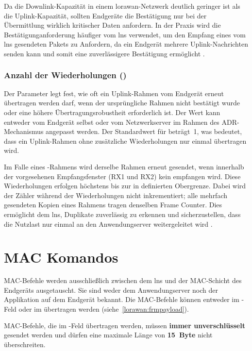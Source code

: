 	Da die Downlink-Kapazität in einem \ac{lorawan}-Netzwerk deutlich geringer ist als die Uplink-Kapazität, sollten Endgeräte die Bestätigung nur bei der Übermittlung wirklich kritischer Daten anfordern. In der Praxis wird die Bestätigunganforderung häufiger vom \ac{lns} verwendet, um den Empfang eines vom \ac{lns} gesendeten Pakets zu Anfordern, da ein Endgerät mehrere Uplink-Nachrichten senden kann und somit eine zuverlässigere Bestätigung ermöglicht \cite{Montagny:2022}.
	
\subsubsection{Anzahl der Wiederholungen () \label{lorawan:nbTrans}}
	Der Parameter  legt fest, wie oft ein Uplink-Rahmen vom Endgerät erneut übertragen werden darf, wenn der ursprüngliche Rahmen nicht bestätigt wurde oder eine höhere Übertragungsrobustheit erforderlich ist. Der Wert kann entweder vom Endgerät selbst oder vom Netzwerkserver im Rahmen des ADR-Mechanismus angepasst werden. Der Standardwert für  beträgt~1, was bedeutet, dass ein Uplink-Rahmen ohne zusätzliche Wiederholungen nur einmal übertragen wird.

	Im Falle eines -Rahmens wird derselbe Rahmen erneut gesendet, wenn innerhalb der vorgesehenen Empfangsfenster (RX1 und RX2) kein  empfangen wird. Diese Wiederholungen erfolgen höchstens bis zur in  definierten Obergrenze. Dabei wird der Zähler  während der Wiederholungen nicht inkrementiert; alle mehrfach gesendeten Kopien eines Rahmens tragen denselben Frame Counter. Dies ermöglicht dem \ac{lns}, Duplikate zuverlässig zu erkennen und sicherzustellen, dass die Nutzlast nur einmal an den Anwendungserver weitergeleitet wird \cite{LoRaAlliance:2020b, Montagny:2022}.


	

\section{MAC Komandos \label{lorawan:macCommands}}
	MAC-Befehle werden ausschlie{\ss}lich zwischen dem \ac{lns} und der MAC-Schicht des Endgeräts ausgetauscht. Sie sind weder dem Anwendungserver noch der Applikation auf dem Endgerät bekannt. Die MAC-Befehle können entweder im -Feld oder im  übertragen werden (siehe~\autoref{lorawan:frmpayload}).
	
	MAC-Befehle, die im -Feld übertragen werden, müssen \textbf{immer unverschlüsselt} gesendet werden und dürfen eine maximale Länge von \textbf{15~Byte} nicht überschreiten.  

